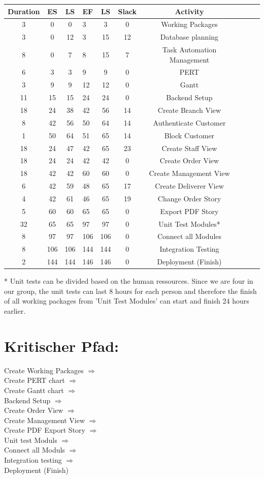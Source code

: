 \documentclass[a4paper]{report}
\begin{document}
        \begin{center}
\begin{tabular}{ |c|c|clc|c|clcl } 
 \hline
 Duration & ES & LS & EF & LS & Slack & Activity \\ \hline
 3 & 0 & 0 & 3 & 3 & 0 & Working Packages  \\ 
 3 & 0 & 12 & 3 & 15 & 12 & Database planning  \\
 8 & 0 & 7 & 8 & 15 & 7 & Task Automation Management \\
 6 & 3 & 3 & 9 & 9 & 0 & PERT \\ 
 3 & 9 & 9 & 12 & 12 & 0 & Gantt \\
 11 & 15 & 15 & 24 & 24 & 0 & Backend Setup \\
 18 & 24 & 38 & 42 & 56 & 14 & Create Branch View  \\ 
 8 & 42 & 56 & 50 & 64 & 14 & Authenticate Customer \\
 1 & 50 & 64 & 51 & 65 & 14 & Block Customer \\
 18 & 24 & 47 & 42 & 65 & 23 & Create Staff View \\ 
 18 & 24 & 24 & 42 & 42 & 0 & Create Order View \\
 18 & 42 & 42 & 60 & 60 & 0 & Create Management View \\
 6 & 42 & 59 & 48 & 65 & 17 & Create Deliverer View  \\ 
 4 & 42 & 61 & 46 & 65 & 19 & Change Order Story \\
 5 & 60 & 60 & 65 & 65 & 0 & Export PDF Story \\
 32 & 65 & 65 & 97 & 97 & 0 & Unit Test Modules* \\ 
 8 & 97 & 97 & 106 & 106 & 0 & Connect all Modules \\
 8 & 106 & 106 & 144 & 144 & 0 & Integration Testing \\
 2 & 144 & 144 & 146 & 146 & 0 & Deployment (Finish) \\
 \hline
\end{tabular}
\end{center}
* Unit tests can be divided based on the human ressources. Since we are four in our group, the unit tests can last 8 hours for each person and therefore the finish of all working packages from 'Unit Test Modules' can start and finish 24 hours earlier.

\section*{Kritischer Pfad:}
Create Working Packages $\Rightarrow$ \\
Create PERT chart $\Rightarrow$ \\
Create Gantt chart $\Rightarrow$ \\
Backend Setup $\Rightarrow$ \\
Create Order View $\Rightarrow$ \\
Create Management View $\Rightarrow$ \\
Create PDF Export Story $\Rightarrow$ \\
Unit test Moduls $\Rightarrow$ \\
Connect all Moduls $\Rightarrow$ \\
Integration testing $\Rightarrow$ \\
Deployment (Finish)
\end{document}
